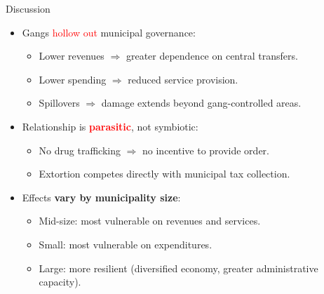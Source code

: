 \documentclass[10pt, hyperref={pdfpagelabels=false}]{beamer}
\begin{document}
\begin{frame}{Discussion}

\begin{itemize}

\item Gangs \textcolor{red}{hollow out} municipal governance:
\begin{itemize}
\item Lower revenues $\Rightarrow$ greater dependence on central transfers.
\item Lower spending $\Rightarrow$ reduced service provision.
\item Spillovers $\Rightarrow$ damage extends beyond gang-controlled areas.
\end{itemize}

\pause

\item Relationship is \textcolor{red}{\textbf{parasitic}}, not symbiotic:
\begin{itemize}
\item No drug trafficking $\Rightarrow$ no incentive to provide order.
\item Extortion competes directly with municipal tax collection.
\end{itemize}

\pause

\item Effects \textbf{vary by municipality size}:
\begin{itemize}
\item Mid-size: most vulnerable on revenues and services.
\item Small: most vulnerable on expenditures.
\item Large: more resilient (diversified economy, greater administrative capacity).
\end{itemize}

\end{itemize}
\end{frame}
\end{document}
